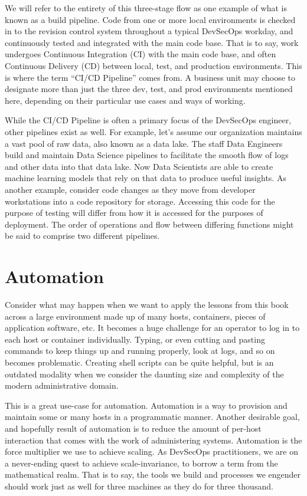 \justifying
We will refer to the entirety of this three-stage flow as one example of what is known as a build pipeline.
Code from one or more local environments is checked in to the revision control system throughout a
typical DevSecOps workday, and continuously tested and integrated with the main code base. That is to say, work undergoes
Continuous Integration (CI) with the main code base,
and often Continuous Delivery (CD) between local, test, and production environments. This is
where the term ``CI/CD Pipeline'' comes from. A business unit may choose to designate more than just the three dev, test,
and prod environments mentioned here, depending on their particular use cases and ways of working.

\justifying
While the CI/CD Pipeline is often a primary focus of the DevSecOps engineer, other pipelines exist as well. For example,
let's assume our organization maintains a vast pool of raw data, also known as a data lake. The staff Data
Engineers build and maintain Data Science pipelines to facilitate the smooth flow
of logs and other data into that data lake. Now Data Scientists are able to create machine learning models that rely on that
data to produce useful insights. As another example, consider code changes as they move from
developer workstations into a code repository for storage. Accessing this code for the purpose of testing will differ from
how it is accessed for the purposes of deployment. The order of operations and flow
between differing functions might be said to comprise two different pipelines.

\section{Automation}

\justifying
Consider what may happen when we want to apply the lessons from this book across a large environment made up of many hosts,
containers, pieces of application software, etc. It becomes a huge challenge for an operator to log in to each host or container
individually. Typing, or even cutting and pasting commands to keep things up and running properly, look at logs,
and so on becomes problematic. Creating shell scripts can be quite helpful, but is an outdated modality when we consider
the daunting size and complexity of the modern administrative domain.

\justifying
This is a great use-case for automation. Automation is a way to provision and maintain some or many hosts
in a programmatic manner. Another desirable goal, and hopefully result of automation is to reduce the amount of
per-host interaction that comes with the work of administering systems. Automation is the force multiplier we use to achieve
scaling. As DevSecOps practitioners, we are on a never-ending quest to achieve
scale-invariance, to borrow a term from the mathematical realm. That is to say, the tools we
build and processes we engender should work just as well for three machines as they do for three thousand.

